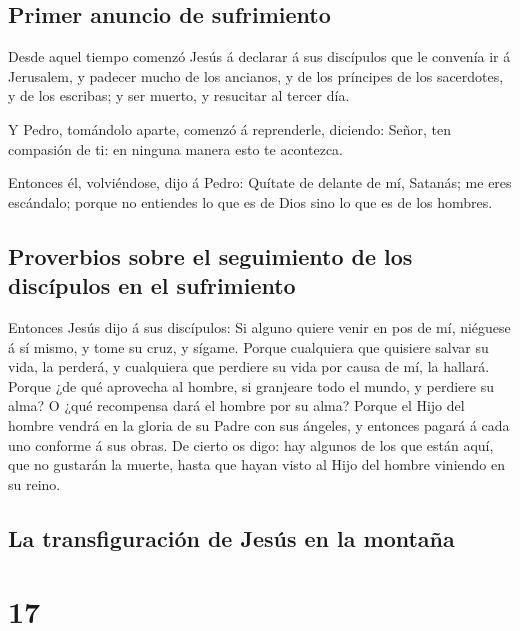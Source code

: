 \hypertarget{primer-anuncio-de-sufrimiento}{%
\subsection{Primer anuncio de
sufrimiento}\label{primer-anuncio-de-sufrimiento}}

 Desde aquel tiempo comenzó Jesús á declarar á sus
discípulos que le convenía ir á Jerusalem, y padecer mucho de los
ancianos, y de los príncipes de los sacerdotes, y de los escribas; y ser
muerto, y resucitar al tercer día.

 Y Pedro, tomándolo aparte, comenzó á reprenderle,
diciendo: Señor, ten compasión de ti: en ninguna manera esto te
acontezca.

 Entonces él, volviéndose, dijo á Pedro: Quítate de delante
de mí, Satanás; me eres escándalo; porque no entiendes lo que es de Dios
sino lo que es de los hombres.

\hypertarget{proverbios-sobre-el-seguimiento-de-los-discuxedpulos-en-el-sufrimiento}{%
\subsection{Proverbios sobre el seguimiento de los discípulos en el
sufrimiento}\label{proverbios-sobre-el-seguimiento-de-los-discuxedpulos-en-el-sufrimiento}}

 Entonces Jesús dijo á sus discípulos: Si alguno quiere
venir en pos de mí, niéguese á sí mismo, y tome su cruz, y sígame.
 Porque cualquiera que quisiere salvar su vida, la perderá,
y cualquiera que perdiere su vida por causa de mí, la hallará.
 Porque ¿de qué aprovecha al hombre, si granjeare todo el
mundo, y perdiere su alma? O ¿qué recompensa dará el hombre por su alma?
 Porque el Hijo del hombre vendrá en la gloria de su Padre
con sus ángeles, y entonces pagará á cada uno conforme á sus obras.
 De cierto os digo: hay algunos de los que están aquí, que
no gustarán la muerte, hasta que hayan visto al Hijo del hombre viniendo
en su reino.

\hypertarget{la-transfiguraciuxf3n-de-jesuxfas-en-la-montauxf1a}{%
\subsection{La transfiguración de Jesús en la
montaña}\label{la-transfiguraciuxf3n-de-jesuxfas-en-la-montauxf1a}}

\hypertarget{section-16}{%
\section{17}\label{section-16}}

